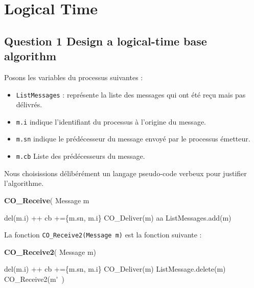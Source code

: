 \chapter{Logical Time}
\section{Question 1 Design a logical-time base algorithm}

Posons les variables du processus suivantes : 

\begin{itemize}
\item  \verb+ListMessages+ : représente la liste des messages qui ont été reçu mais pas délivrés.
\item \verb+m.i+ indique l'identifiant du processus à l'origine du message.
\item \verb+m.sn+ indique le prédécesseur du message envoyé par le processus émetteur.
\item \verb+m.cb+ Liste des prédécesseurs du message.
\end{itemize}
Nous choisissions délibérément un langage pseudo-code verbeux pour justifier l'algorithme.
\begin{algorithm}
  \caption{\textbf{CO\_Receive}( Message m}
\label{algo:receive}
\begin{algorithmic}[1]
     \STATE  del(m.i) ++
     \STATE  cb +=\{m.sn, m.i\}
   \STATE  CO\_Deliver(m)
\STATE aa%
   \ENDFOR
   \ELSE
   \STATE ListMessages.add(m)
  \ENDIF
 \end{algorithmic}
\end{algorithm}


La fonction \verb+CO_Receive2(Message m)+ est la fonction suivante : 
\begin{algorithm}
  \caption{\textbf{CO\_Receive2}( Message m)}
\label{algo:reveive2}
\begin{algorithmic}[1]
     \STATE  del(m.i) ++
     \STATE  cb +=\{m.sn, m.i\}
   \STATE  CO\_Deliver(m)
   \STATE  ListMessage.delete(m)
   \STATE CO\_Receive2(m\'~)
   \ENDFOR
  \ENDIF
 \end{algorithmic}
\end{algorithm}


